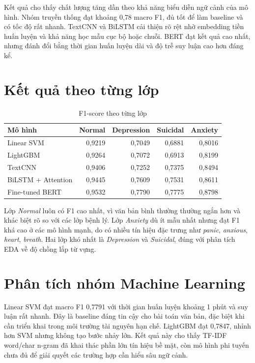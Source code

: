 \documentclass[12pt,a4paper,oneside]{report}
\newlength{\manualparindent}
\newcommand{\manualindent}{\hspace*{\manualparindent}}
\begin{document}
\manualindent%
Kết quả cho thấy chất lượng tăng dần theo khả năng biểu diễn ngữ cảnh của mô hình. Nhóm truyền thống đạt khoảng 0,78 macro F1, đủ tốt để làm baseline và có tốc độ rất nhanh. TextCNN và BiLSTM cải thiện rõ rệt nhờ embedding tiền huấn luyện và khả năng học mẫu cục bộ hoặc chuỗi. BERT đạt kết quả cao nhất, nhưng đánh đổi bằng thời gian huấn luyện dài và độ trễ suy luận cao hơn đáng kể.

\section{Kết quả theo từng lớp}

\begin{table}[H]
  \centering
  \caption{F1-score theo từng lớp}
  \label{tab:per-class-f1}
  \small
  \begin{tabular}{lrrrr}
    \toprule
    Mô hình & Normal & Depression & Suicidal & Anxiety \\
    \midrule
    Linear SVM & 0,9219 & 0,7049 & 0,6881 & 0,8016 \\
    LightGBM & 0,9264 & 0,7072 & 0,6913 & 0,8199 \\
    TextCNN & 0,9406 & 0,7252 & 0,7375 & 0,8494 \\
    BiLSTM + Attention & 0,9445 & 0,7609 & 0,7531 & 0,8611 \\
    Fine-tuned BERT & 0,9532 & 0,7790 & 0,7775 & 0,8798 \\
    \bottomrule
  \end{tabular}
\end{table}

\manualindent%
Lớp \textit{Normal} luôn có F1 cao nhất, vì văn bản bình thường thường ngắn hơn và khác biệt rõ so với các lớp bệnh lý. Lớp \textit{Anxiety} dù ít mẫu nhất nhưng đạt F1 khá cao ở các mô hình mạnh, do có nhiều tín hiệu đặc trưng như \textit{panic}, \textit{anxious}, \textit{heart}, \textit{breath}. Hai lớp khó nhất là \textit{Depression} và \textit{Suicidal}, đúng với phân tích EDA về độ chồng lắp từ vựng.

\section{Phân tích nhóm Machine Learning}

\manualindent%
Linear SVM đạt macro F1 0,7791 với thời gian huấn luyện khoảng 1 phút và suy luận rất nhanh. Đây là baseline đáng tin cậy cho bài toán văn bản, đặc biệt khi cần triển khai trong môi trường tài nguyên hạn chế. LightGBM đạt 0,7847, nhỉnh hơn SVM nhưng không tạo bước nhảy lớn. Kết quả này cho thấy TF-IDF word/char n-gram đã khai thác phần lớn tín hiệu bề mặt, còn mô hình phi tuyến chưa đủ để giải quyết các trường hợp cần hiểu sâu ngữ cảnh.
\end{document}
